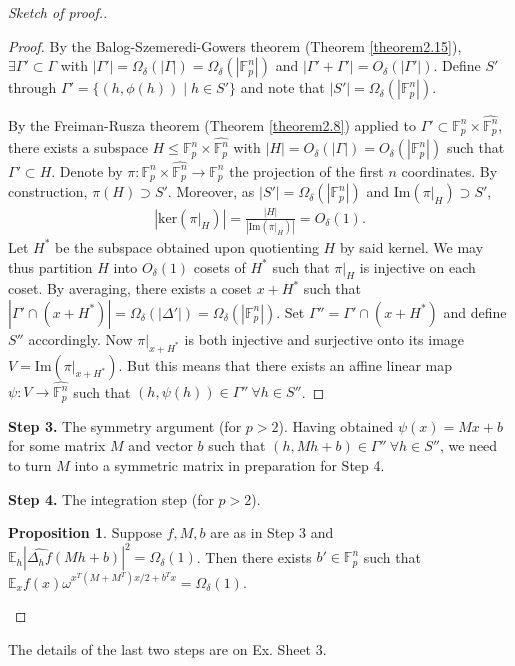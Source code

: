 \documentclass{article}
\theoremstyle{definition}
\newtheorem{prop}[theorem]{Proposition}
\begin{document}
\begin{proof}[Sketch of proof.]
\begin{proof}
        By the Balog-Szemeredi-Gowers theorem (Theorem \ref{theorem2.15}), $\exists \Gamma' \subset \Gamma$ with $\left|\Gamma'\right|=\Omega_\delta(\left|\Gamma\right|) = \Omega_\delta(\left|\mathbb{F}_p^n\right|)$ and $\left|\Gamma'+\Gamma'\right| = O_{\delta}(\left|\Gamma'\right|)$. Define $S'$ through $\Gamma' = \{(h,\phi(h)) \mid h \in S'\}$ and note that $\left|S'\right| = \Omega_\delta(\left|\mathbb{F}_p^n\right|)$. 
        \vspace{1mm}
         
        By the Freiman-Rusza theorem (Theorem \ref{theorem2.8}) applied to $\Gamma' \subset \mathbb{F}_p^n \times \widehat{\mathbb{F}_p^n}$, there exists a subspace $H \le \mathbb{F}_p^n \times \widehat{\mathbb{F}_p^n}$ with $\left|H\right| = O_\delta(\left|\Gamma\right|)=O_\delta(\left|\mathbb{F}_p^n\right|)$ such that $\Gamma' \subset H$. Denote by $\pi : \mathbb{F}_p^n \times \widehat{\mathbb{F}_p^n} \to \mathbb{F}_p^n$ the projection of the first $n$ coordinates. By construction, $\pi(H) \supset S'$. Moreover, as $\left|S'\right|=\Omega_\delta(\left|\mathbb{F}_p^n\right|)$ and $\text{Im}(\pi|_H) \supset S'$, 
        \begin{align*}
            \left|\text{ker}(\pi|_H)\right| = \frac{\left|H\right|}{\left|\text{Im}(\pi|_H)\right|} = O_{\delta}(1).
        \end{align*}
        Let $H^*$ be the subspace obtained upon quotienting $H$ by said kernel. We may thus partition $H$ into $O_{\delta}(1)$ cosets of $H^*$ such that $\pi|_H$ is injective on each coset. By averaging, there exists a coset $x+H^*$ such that $\left|\Gamma' \cap (x +H^*)\right|=\Omega_\delta(\left|\Delta'\right|) = \Omega_\delta(\left|\mathbb{F}_p^n\right|)$. Set $\Gamma'' = \Gamma' \cap (x+H^*)$ and define $S''$ accordingly. Now $\pi|_{x+H^*}$ is both injective and surjective onto its image $V = \text{Im}(\pi|_{x+H^*})$. But this means that there exists an affine linear map $\psi : V \to \widehat{\mathbb{F}_p^n}$ such that $(h,\psi(h)) \in \Gamma'' ~\forall h \in S''$.
    \end{proof}
    \textbf{Step 3.} The symmetry argument (for $p>2$). Having obtained $\psi(x) = Mx+b$ for some matrix $M$ and vector $b$ such that $(h,Mh+b) \in \Gamma'' ~\forall h \in S''$, we need to turn $M$ into a symmetric matrix in preparation for Step 4.
    \vspace{1mm}
     
    \textbf{Step 4.} The integration step (for $p>2$).
    \begin{prop}\label{4.18}
        Suppose $f,M,b$ are as in Step 3 and $\mathbb{E}_h\left|\widehat{\Delta_hf}(Mh+b)\right|^2 = \Omega_\delta(1)$. Then there exists $b' \in \mathbb{F}_p^n$ such that $\mathbb{E}_x f(x)\omega^{x^T(M+M^T)x/2 + b^Tx} = \Omega_{\delta}(1)$.
    \end{prop}
\end{proof}
The details of the last two steps are on Ex. Sheet 3.
\end{document}
